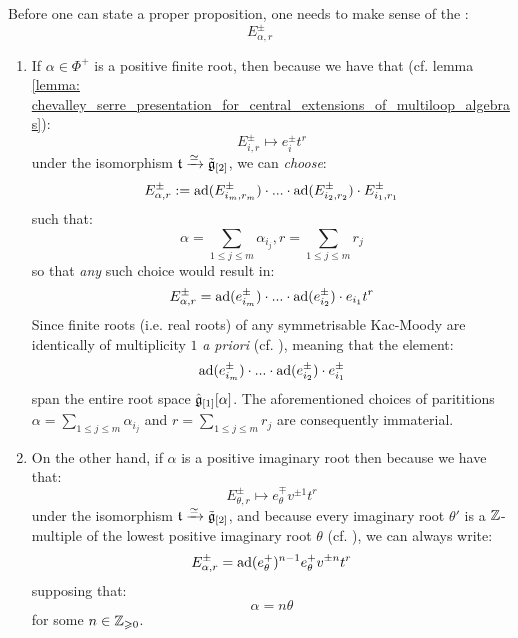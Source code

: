         \begin{remark} \label{remark: root_vectors_for_toroidal_lie_algebras}
            Before one can state a proper proposition, one needs to make sense of the :
                $$E_{\alpha, r}^{\pm}$$
            \begin{enumerate}
                \item If $\alpha \in \Phi^+$ is a positive finite root, then because we have that (cf. lemma \ref{lemma: chevalley_serre_presentation_for_central_extensions_of_multiloop_algebras}):
                    $$E_{i, r}^{\pm} \mapsto e_i^{\pm} t^r$$
                under the isomorphism $\mathfrak{t} \xrightarrow[]{\simeq} \tilde{\mathfrak{g}}_{[2]}$, we can \textit{choose}:
                    $$E_{\alpha, r}^{\pm} := \mathrm{ad}(E_{i_m, r_m}^{\pm}) \cdot ... \cdot \mathrm{ad}(E_{i_2, r_2}^{\pm}) \cdot E_{i_1, r_1}^{\pm}$$
                such that:
                    $$\alpha = \sum_{1 \leq j \leq m} \alpha_{i_j}, r = \sum_{1 \leq j \leq m} r_j$$
                so that \textit{any} such choice would result in:
                    $$E_{\alpha, r}^{\pm} = \mathrm{ad}(e_{i_m}^{\pm}) \cdot ... \cdot \mathrm{ad}(e_{i_2}^{\pm}) \cdot e_{i_1} t^r$$
                Since finite roots (i.e. real roots) of any symmetrisable Kac-Moody are identically of multiplicity $1$ \textit{a priori} (cf. \cite[Chapter 4]{kac_infinite_dimensional_lie_algebras}), meaning that the element:
                    $$\mathrm{ad}(e_{i_m}^{\pm}) \cdot ... \cdot \mathrm{ad}(e_{i_2}^{\pm}) \cdot e_{i_1}^{\pm}$$
                span the entire root space $\hat{\mathfrak{g}}_{[1]}[\alpha]$. The aforementioned choices of parititions $\alpha = \sum_{1 \leq j \leq m} \alpha_{i_j}$ and $r = \sum_{1 \leq j \leq m} r_j$ are consequently immaterial.
                
                \item On the other hand, if $\alpha$ is a positive imaginary root then because we have that:
                    $$E_{\theta, r}^{\pm} \mapsto e_{\theta}^{\mp} v^{\pm 1} t^r$$
                under the isomorphism $\mathfrak{t} \xrightarrow[]{\simeq} \tilde{\mathfrak{g}}_{[2]}$, and because every imaginary root $\theta'$ is a $\mathbb{Z}$-multiple of the lowest positive imaginary root $\theta$ (cf. \cite[Chapter 6]{kac_infinite_dimensional_lie_algebras}), we can always write:
                    $$E_{\alpha, r}^{\pm} = \mathrm{ad}(e_{\theta}^+)^{n - 1} e_{\theta}^+ v^{\pm n} t^r$$
                supposing that:
                    $$\alpha = n \theta$$
                for some $n \in \mathbb{Z}_{\geqslant 0}$.
            \end{enumerate}
        \end{remark}
